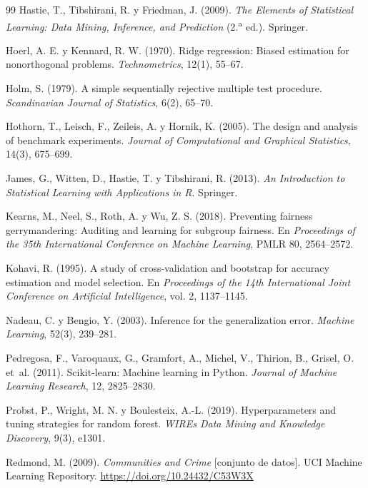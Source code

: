 \documentclass[11pt,a4paper]{article}
\begin{document}
\begin{thebibliography}{99}
Hastie, T., Tibshirani, R. y Friedman, J. (2009). \textit{The Elements of Statistical Learning: Data Mining, Inference, and Prediction} (2.\textsuperscript{a} ed.). Springer.

Hoerl, A. E. y Kennard, R. W. (1970). Ridge regression: Biased estimation for nonorthogonal problems. \textit{Technometrics}, 12(1), 55--67.

Holm, S. (1979). A simple sequentially rejective multiple test procedure. \textit{Scandinavian Journal of Statistics}, 6(2), 65--70.

Hothorn, T., Leisch, F., Zeileis, A. y Hornik, K. (2005). The design and analysis of benchmark experiments. \textit{Journal of Computational and Graphical Statistics}, 14(3), 675--699.

James, G., Witten, D., Hastie, T. y Tibshirani, R. (2013). \textit{An Introduction to Statistical Learning with Applications in R}. Springer.

Kearns, M., Neel, S., Roth, A. y Wu, Z. S. (2018). Preventing fairness gerrymandering: Auditing and learning for subgroup fairness. En \textit{Proceedings of the 35th International Conference on Machine Learning}, PMLR 80, 2564--2572.

Kohavi, R. (1995). A study of cross-validation and bootstrap for accuracy estimation and model selection. En \textit{Proceedings of the 14th International Joint Conference on Artificial Intelligence}, vol. 2, 1137--1145.

Nadeau, C. y Bengio, Y. (2003). Inference for the generalization error. \textit{Machine Learning}, 52(3), 239--281.

Pedregosa, F., Varoquaux, G., Gramfort, A., Michel, V., Thirion, B., Grisel, O. et~al. (2011). Scikit-learn: Machine learning in Python. \textit{Journal of Machine Learning Research}, 12, 2825--2830.

Probst, P., Wright, M. N. y Boulesteix, A.-L. (2019). Hyperparameters and tuning strategies for random forest. \textit{WIREs Data Mining and Knowledge Discovery}, 9(3), e1301.

Redmond, M. (2009). \textit{Communities and Crime} [conjunto de datos]. UCI Machine Learning Repository. \url{https://doi.org/10.24432/C53W3X}


\end{thebibliography}
\end{document}
